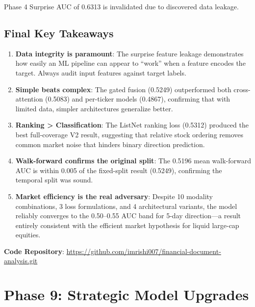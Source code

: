 \documentclass[12pt,a4paper]{article}
\begin{document}
\noindent *Phase 4 Surprise AUC of 0.6313 is invalidated due to discovered data leakage.

\subsection{Final Key Takeaways}

\begin{enumerate}
    \item \textbf{Data integrity is paramount}: The surprise feature leakage demonstrates how easily an ML pipeline can appear to ``work'' when a feature encodes the target. Always audit input features against target labels.
    
    \item \textbf{Simple beats complex}: The gated fusion (0.5249) outperformed both cross-attention (0.5083) and per-ticker models (0.4867), confirming that with limited data, simpler architectures generalize better.
    
    \item \textbf{Ranking > Classification}: The ListNet ranking loss (0.5312) produced the best full-coverage V2 result, suggesting that relative stock ordering removes common market noise that hinders binary direction prediction.
    
    \item \textbf{Walk-forward confirms the original split}: The 0.5196 mean walk-forward AUC is within 0.005 of the fixed-split result (0.5249), confirming the temporal split was sound.
    
    \item \textbf{Market efficiency is the real adversary}: Despite 10 modality combinations, 3 loss formulations, and 4 architectural variants, the model reliably converges to the 0.50--0.55 AUC band for 5-day direction---a result entirely consistent with the efficient market hypothesis for liquid large-cap equities.
\end{enumerate}

\vspace{1cm}

\noindent\textbf{Code Repository}: \url{https://github.com/imrishi007/financial-document-analysis.git}

\newpage
\section{Phase 9: Strategic Model Upgrades}
\end{document}
